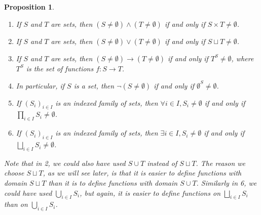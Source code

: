 \documentclass{article}
\newtheorem{proposition}{Proposition}
\theoremstyle{definition}
\begin{document}
	\begin{proposition}
	\begin{enumerate}
		\item If $S$ and $T$ are sets, then $(S\ne\emptyset) \land (T\ne\emptyset)$ if and only if $S \times T\ne\emptyset$.
		\item If $S$ and $T$ are sets, then $(S\ne\emptyset) \lor (T\ne\emptyset)$ if and only if $S \sqcup T \ne \emptyset$.
		\item If $S$ and $T$ are sets, then $(S\ne\emptyset) \rightarrow (T\ne\emptyset)$ if and only if $T^S \ne \emptyset$, where $T^S$ is the set of functions $f : S \to T$.
		\item In particular, if $S$ is a set, then $\lnot(S\ne \emptyset)$ if and only if $\emptyset^S\ne \emptyset$.
		\item If $(S_i)_{i\in I}$ is an indexed family of sets, then $\forall i\in I, S_i \ne \emptyset$ if and only if $\prod_{i\in I} S_i \ne \emptyset$.
		\item If $(S_i)_{i\in I}$ is an indexed family of sets, then $\exists i\in I, S_i \ne \emptyset$ if and only if $\bigsqcup_{i\in I} S_i \ne \emptyset$.
	\end{enumerate}
	Note that in 2, we could also have used $S\cup T$ instead of $S\sqcup T$.  The reason we choose $S\sqcup T$, as we will see later, is that it is easier to define functions with domain $S\sqcup T$ than it is to define functions with domain $S\cup T$.  Similarly in 6, we could have used $\bigcup_{i\in I} S_i$, but again, it is easier to define functions on $\bigsqcup_{i\in I} S_i$ than on $\bigcup_{i\in I} S_i$.
	

\end{proposition}
\end{document}
